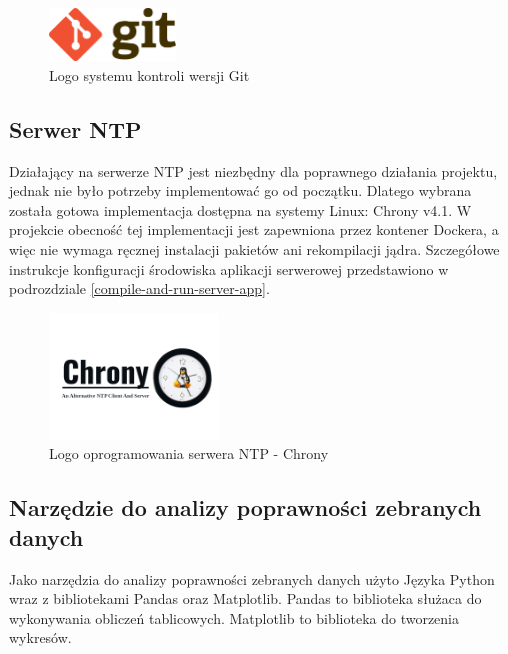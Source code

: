 \documentclass[12pt,oneside,a4paper]{book}
\theoremstyle{break}
\begin{document}
\begin{figure}[H]
    \begin{center}
        \includegraphics[width=0.3\textwidth]{logo_git.png}        
        \caption{Logo systemu kontroli wersji Git}        
        \label{rys:logo-git}
    \end{center}
\end{figure}

\subsection{Serwer NTP}
Działający na serwerze NTP jest niezbędny dla poprawnego działania projektu, jednak
nie było potrzeby implementować go od początku. Dlatego wybrana została gotowa implementacja
dostępna na systemy Linux: Chrony v4.1. W projekcie obecność tej implementacji jest
zapewniona przez kontener Dockera, a więc nie wymaga ręcznej instalacji pakietów
ani rekompilacji jądra. Szczegółowe instrukcje konfiguracji środowiska
aplikacji serwerowej przedstawiono w podrozdziale \ref*{compile-and-run-server-app}.

\begin{figure}[H]
    \begin{center}
        \includegraphics[width=0.4\textwidth]{chrony_logo.png}        
        \caption{Logo oprogramowania serwera NTP - Chrony}        
    \end{center}
\end{figure}


\subsection{Narzędzie do analizy poprawności zebranych danych}
Jako narzędzia do analizy poprawności zebranych danych użyto Języka Python wraz 
z bibliotekami Pandas\cite{numpy} oraz Matplotlib\cite{matplotlib}. Pandas 
to biblioteka
służaca do wykonywania obliczeń tablicowych. 
Matplotlib to biblioteka do tworzenia wykresów.
\end{document}
